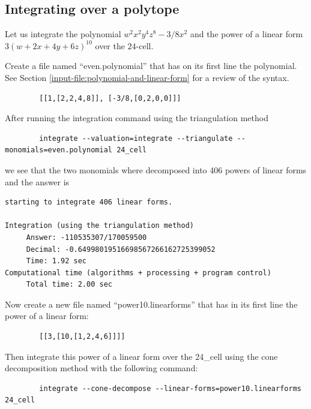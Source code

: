 \documentclass{article}
\begin{document}
\subsection{Integrating over a polytope}

Let us integrate the polynomial $w^2x^2y^4z^8 -3/8x^2$ and the power of a linear form $3(w +2x + 4y + 6z)^{10}$ over the $24$-cell.

 

Create a file named ``even.polynomial'' that has on its first line the polynomial. See Section \ref{input-file:polynomial-and-linear-form} for a review of the syntax.
        
        \begin{verbatim}
        [[1,[2,2,4,8]], [-3/8,[0,2,0,0]]]
        \end{verbatim}

After running the integration command using the triangulation method
        \begin{verbatim}
        integrate --valuation=integrate --triangulate --monomials=even.polynomial 24_cell
        \end{verbatim}


we see that the two monomials where decomposed into 406 powers of linear forms and the answer is


\begin{verbatim}
starting to integrate 406 linear forms.

Integration (using the triangulation method)
     Answer: -110535307/170059500
     Decimal: -0.64998019516698567266162725399052
     Time: 1.92 sec
Computational time (algorithms + processing + program control)
     Total time: 2.00 sec
\end{verbatim}



Now create a new file named ``power10.linearforms'' that has in its first line the power of a linear form:

        \begin{verbatim}
        [[3,[10,[1,2,4,6]]]]
        \end{verbatim}
        
Then integrate this power of a linear form over the 24\_cell using the cone decomposition method with the following command:    
        \begin{verbatim}
        integrate --cone-decompose --linear-forms=power10.linearforms  24_cell
        \end{verbatim}
        
\end{document}

